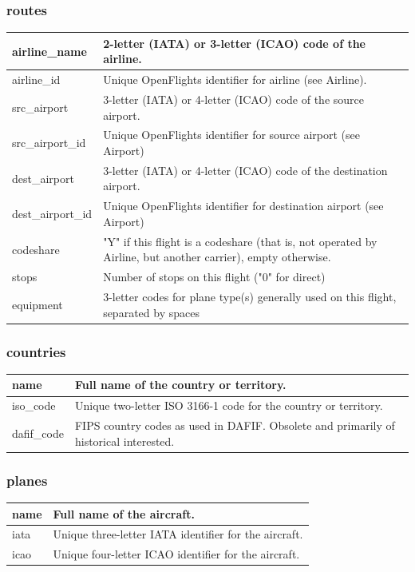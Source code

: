 \documentclass[12pt]{article}
\begin{document}
\subsubsection{routes}
\label{sec:org31e2ce4}
\begin{center}
\begin{tabular}{p{3cm}|p{11cm}}
airline\_name & 2-letter (IATA) or 3-letter (ICAO) code of the airline.\\[0pt]
  \hline
airline\_id & Unique OpenFlights identifier for airline (see Airline).\\[0pt]
  \hline
src\_airport & 3-letter (IATA) or 4-letter (ICAO) code of the source airport.\\[0pt]
  \hline
src\_airport\_id & Unique OpenFlights identifier for source airport (see Airport)\\[0pt]
  \hline
dest\_airport & 3-letter (IATA) or 4-letter (ICAO) code of the destination airport.\\[0pt]
  \hline
dest\_airport\_id & Unique OpenFlights identifier for destination airport (see Airport)\\[0pt]
  \hline
codeshare & "Y" if this flight is a codeshare (that is, not operated by Airline, but another carrier), empty otherwise.\\[0pt]
  \hline
stops & Number of stops on this flight ("0" for direct)\\[0pt]
  \hline
equipment & 3-letter codes for plane type(s) generally used on this flight, separated by spaces\\[0pt]
\end{tabular}
\end{center}

\subsubsection{countries}
\label{sec:org5c428e5}
\begin{center}
\begin{tabular}{p{2cm}|p{11cm}}
name & Full name of the country or territory.\\[0pt]
  \hline
iso\_code & Unique two-letter ISO 3166-1 code for the country or territory.\\[0pt]
  \hline
dafif\_code & FIPS country codes as used in DAFIF. Obsolete and primarily of historical interested.\\[0pt]
\end{tabular}
\end{center}

\subsubsection{planes}
\label{sec:orgad0c15a}
\begin{center}
\begin{tabular}{p{2cm}|p{11cm}}
name & Full name of the aircraft.\\[0pt]
  \hline
iata & Unique three-letter IATA identifier for the aircraft.\\[0pt]
  \hline
icao & Unique four-letter ICAO identifier for the aircraft.\\[0pt]
\end{tabular}
\end{center}
\end{document}
